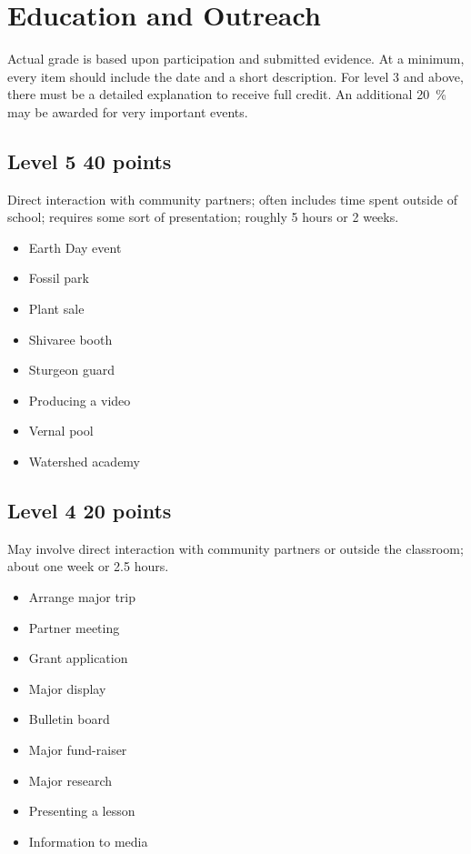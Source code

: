 \documentclass[letterpaper,10pt]{memoir}
\begin{document}
{\rightskip 0in
\section*{Education and Outreach}

Actual grade is based upon participation and submitted evidence. At a minimum, every item should include the date and a short description. For level 3 and above, there must be a detailed explanation to receive full credit. An additional \SI{20}{\percent} may be awarded for very important events.

\subsection*{Level 5 \hfill 40 points}

	Direct interaction with community partners; often includes time spent outside of school; requires some sort of presentation; roughly 5 hours or 2 weeks.

	\begin{multicols}{3}\begin{itemize}[label=$-$,itemsep=0mm]
	\item Earth Day event
	\item Fossil park
	\item Plant sale
	\item Shivaree booth
	\item Sturgeon guard
	\item Producing a video
	\item Vernal pool
	\item Watershed academy
	\end{itemize}\end{multicols}

\subsection*{Level 4 \hfill 20 points}

	May involve direct interaction with community partners or outside the classroom; about one week or 2.5 hours.

	\begin{multicols}{3}\begin{itemize}[label=$-$,itemsep=0mm]
	\item Arrange major trip
	\item Partner meeting
	\item Grant application
	\item Major display
	\item Bulletin board
	\item Major fund-raiser
	\item Major research
	\item Presenting a lesson
	\item Information to media
	\end{itemize}\end{multicols}

}
\end{document}
